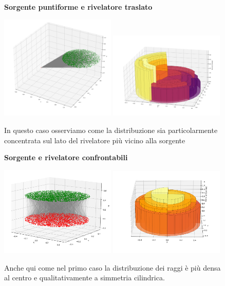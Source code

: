         \begin{figure}[ht]
            \textbf{Sorgente puntiforme e rivelatore traslato}
            
            \centering
            \includegraphics[width=0.49\textwidth]{images/accettanza/example2.1.png}
            \includegraphics[width=0.49\textwidth]{images/accettanza/example2.2.png}
            \caption{In questo caso osserviamo come la distribuzione sia particolarmente concentrata sul lato del rivelatore più vicino alla sorgente}
        \end{figure}
        
        \begin{figure}[ht]
            \textbf{Sorgente e rivelatore confrontabili}
            
            \centering
            \includegraphics[width=0.49\textwidth]{images/accettanza/example3.1.png}
            \includegraphics[width=0.49\textwidth]{images/accettanza/example3.2.png}
            \caption{Anche qui come nel primo caso la distribuzione dei raggi è più densa al centro e qualitativamente a simmetria cilindrica.}
        \end{figure}

